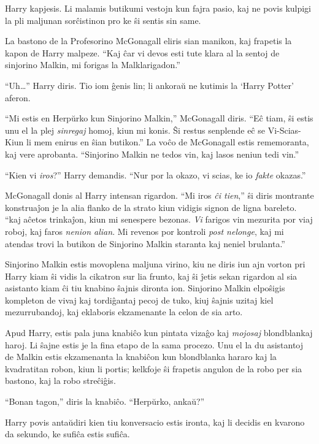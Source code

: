Harry kapjesis. Li malamis butikumi vestojn kun fajra pasio, kaj ne
povis kulpigi la pli maljunan sorĉistinon pro ke ŝi sentis sin same.

La bastono de la Profesorino McGonagall eliris sian manikon,
kaj frapetis la kapon de Harry malpeze. ``Kaj ĉar vi devos esti tute klara
al la sentoj de sinjorino Malkin, mi forigas la Malklarigadon.''

``Uh\ldots'' Harry diris. Tio iom ĝenis lin; li ankoraŭ ne kutimis la
‘Harry Potter’ aferon.

``Mi estis en Herpŭrko kun Sinjorino Malkin,'' McGonagall diris. ``Eĉ
tiam, ŝi estis unu el la plej \emph{sinregaj} homoj, kiun mi konis. Ŝi
restus senplende eĉ se Vi-Scias-Kiun li mem enirus en ŝian butikon.''  La
voĉo de McGonagall estis rememoranta, kaj vere aprobanta. ``Sinjorino
Malkin ne tedos vin, kaj lasos neniun tedi vin.''

``Kien vi \emph{iros}?'' Harry demandis. ``Nur por la okazo, vi scias,
ke io \emph{fakte} okazas.''

McGonagall donis al Harry intensan rigardon. ``Mi iros \emph{ĉi
tien},'' ŝi diris montrante konstruaĵon je la alia flanko de la strato
kiun vidigis signon de ligna bareleto. ``kaj aĉetos trinkaĵon, kiun mi
senespere bezonas. \emph{Vi} farigos vin mezurita por viaj roboj,
kaj faros \emph{nenion alian}. Mi revenos por kontroli \emph{post
nelonge}, kaj mi atendas trovi la butikon de Sinjorino Malkin staranta
kaj neniel brulanta.''

Sinjorino Malkin estis movoplena maljuna virino, kiu ne diris iun ajn
vorton pri Harry kiam ŝi vidis la cikatron sur lia frunto, kaj ŝi
ĵetis sekan rigardon al sia asistanto kiam ĉi tiu knabino ŝajnis
dironta ion. Sinjorino Malkin elpoŝigis kompleton de vivaj
kaj tordiĝantaj pecoj de tuko, kiuj ŝajnis uzitaj kiel mezurrubandoj, kaj
eklaboris ekzamenante la celon de sia arto.

Apud Harry, estis pala juna knabiĉo kun pintata vizaĝo kaj
\emph{mojosaj} blondblankaj haroj. Li ŝajne estis je la fina etapo de
la sama procezo. Unu el la du asistantoj de Malkin estis ekzamenanta
la knabiĉon kun blondblanka hararo kaj la kvadratitan robon, kiun li
portis; kelkfoje ŝi frapetis angulon de la robo per sia bastono, kaj
la robo streĉiĝis.

``Bonan tagon,'' diris la knabiĉo. ``Herpŭrko, ankaŭ?''

Harry povis antaŭdiri kien tiu konversacio estis ironta, kaj li
decidis en kvarono da sekundo, ke sufiĉa estis sufiĉa.

